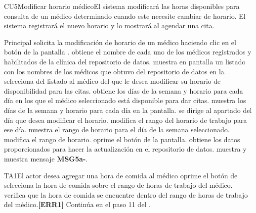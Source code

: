 \begin{UseCase}{CU5}{Modificar horario médico}{El sistema modificará las horas disponibles para consulta de un médico determinado cuando este necesite cambiar de horario. El sistema registrará el nuevo horario y lo mostrará al agendar una cita.}
{  }
\end{UseCase}

\begin{UCtrayectoria}{Principal}  
  \UCpaso[\UCactor] solicita la modificación de horario de un médico haciendo clic en el botón  de la pantalla .
  \UCpaso obtiene el nombre de cada uno de los médicos registrados y habilitados de la clínica del repositorio de datos.
  \UCpaso muestra en pantalla un listado con los nombres de los médicos que obtuvo del repositorio de datos en la 
  \UCpaso[\UCactor] selecciona del listado al médico del que le desea modificar su horario de disponibilidad para las citas.
  \UCpaso obtiene los días de la semana y horario para cada día en los que el médico seleccionado está disponible para dar citas.
  \UCpaso muestra los días de la semana y horario para cada día en la pantalla. 
  \UCpaso[\UCactor] se dirige al apartado del día que desea modificar el horario.
  \UCpaso[\UCactor] modifica el rango del horario de trabajo para ese día.
  \UCpaso muestra el rango de horario para el día de la semana seleccionado.
  \UCpaso[\UCactor] modifica el rango de horario.
  \UCpaso[\UCactor] oprime el botón  de la pantalla.
  \UCpaso obtiene los datos proporcionados para hacer la actualización en el repositorio de datos.
  \UCpaso muestra  y muestra mensaje {\bf MSG5a-}.     
\end{UCtrayectoria}

\begin{UCtrayectoriaA}{TA1}{El actor desea agregar una hora de comida al médico}			
			\UCpaso[\UCactor] oprime el botón  de 
      \UCpaso[\UCactor] selecciona la hora de comida sobre el rango de horas de trabajo del médico.
      \UCpaso verifica que la hora de comida se encuentre dentro del rango de horas de trabajo del médico.\textbf{[ERR1]}
      \UCpaso Continúa en el paso 11 del .
\end{UCtrayectoriaA}

